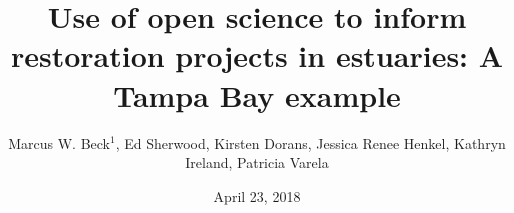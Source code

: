 \documentclass[serif]{beamer}\usepackage[]{graphicx}\usepackage[]{color}
\begin{document}
\title[Open science for restoration]{\textbf{Use of open science to inform restoration projects in estuaries: A Tampa Bay example}}
\author[Beck et al.]{Marcus W. Beck$^1$, Ed Sherwood, Kirsten Dorans, Jessica Renee Henkel, Kathryn Ireland, Patricia Varela}


\date{April 23, 2018}


\begin{frame}[shrink]
\vspace{0.2in}
\titlepage
\end{frame}
\end{document}
